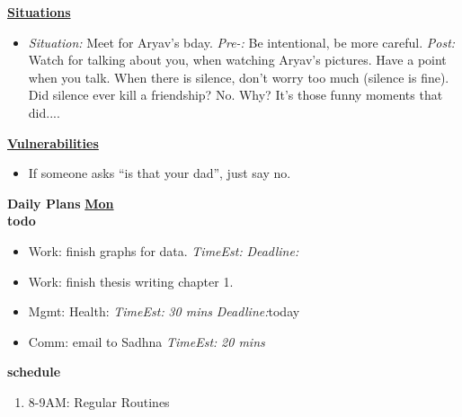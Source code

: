 \documentclass[11pt]{article}
\newcommand{\te}[1]{\textit{TimeEst:} \textit{#1}}
\newcommand{\dl}[1]{\textit{Deadline:}#1}
\newcommand{\comments}[1]{}
\begin{document}
{%

\textbf{\small \underline{Situations}} \\ 
\begin{itemize}
  \tiny \item \tiny \textit{Situation:} Meet for Aryav's bday.  \textit{Pre-:} Be intentional, be more careful. \textit{Post:} Watch for talking about you, when watching Aryav's pictures. Have a point when you talk. When there is silence, don't worry too much (silence is fine). Did silence ever kill a friendship? No. Why? It's those funny moments that did.... 
\end{itemize} 

\textbf{\small \underline{Vulnerabilities}} \\
\begin{itemize}
\tiny \item \tiny  If someone asks ``is that your dad'', just say no. 
\end{itemize} 

\newpage 

\comments{
\noindent\begin{minipage}{\textwidth}
\begin{minipage}[c][6cm][c]{\dimexpr0.5\textwidth-0.5\Colsep\relax}
\lipsum[4]
\end{minipage}\hfill
\begin{minipage}[c][6cm][c]{\dimexpr0.5\textwidth-0.5\Colsep\relax}
\lipsum[4]
\end{minipage}%
\end{minipage}
\lipsum[4]
}


\textbf{Daily Plans} 
\textbf{\small \underline{Mon}} \\
\textbf{\small todo} \\
\begin{itemize} 
  \tiny \item \tiny Work: finish graphs for data. \te{} \dl{} 
  \tiny \item \tiny Work: finish thesis writing chapter 1. 
  \tiny \item \tiny Mgmt: Health:  \te{30 mins}  \dl{today}  
  \tiny \item \tiny Comm: email to Sadhna \te{20 mins} 
\end{itemize} 
\textbf{\small schedule} \\
  \begin{enumerate}
    \tiny \item \tiny 8-9AM: Regular Routines 
  \end{enumerate} 

}
\end{document}
